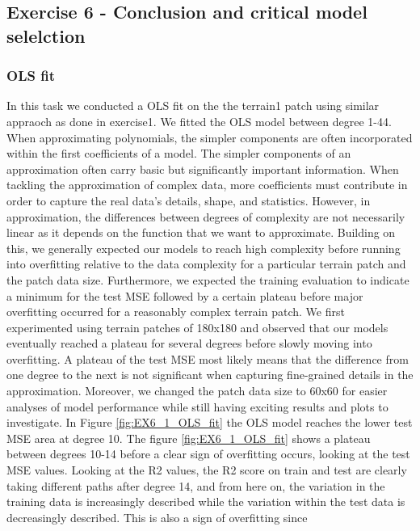 \documentclass[11pt, a4paper]{article}
\begin{document}
\newpage
\subsection*{Exercise 6 - Conclusion and critical model selelction}
\subsubsection*{OLS fit}
In this task we conducted a OLS fit on the the terrain1 patch using similar appraoch as done in exercise1. We fitted the OLS model between degree 1-44.
When approximating polynomials, the simpler components are often incorporated within the first coefficients of a model. The simpler components of an approximation 
often carry basic but significantly important information. When tackling the approximation of complex data, more coefficients must contribute in order to capture the 
real data's details, shape, and statistics. However, in approximation, the differences between degrees of complexity are not necessarily linear as it depends on the 
function that we want to approximate. Building on this, we generally expected our models to reach high complexity before running into overfitting relative to the data 
complexity for a particular terrain patch and the patch data size. Furthermore, we expected the training evaluation to indicate a minimum for the test MSE followed by a
certain plateau before major overfitting occurred for a reasonably complex terrain patch. 
We first experimented using terrain patches of 180x180 and observed that our models eventually reached a plateau for several degrees before slowly moving into overfitting.
A plateau of the test MSE most likely means that the difference from one degree to the next is not significant when capturing fine-grained details in the approximation.
Moreover, we changed the patch data size to 60x60 for easier analyses of model performance while still having exciting results and plots to investigate. 
In Figure \ref{fig:EX6_1_OLS_fit} the OLS model reaches the lower test MSE area at degree 10. The figure \ref{fig:EX6_1_OLS_fit} shows a plateau between degrees 10-14 before a clear sign of overfitting occurs, 
looking at the test MSE values. Looking at the R2 values, the R2 score on train and test are clearly taking different paths after degree 14, and from here on, 
the variation in the training data is increasingly described while the variation within the test data is decreasingly described. This is also a sign of overfitting since
\end{document}
